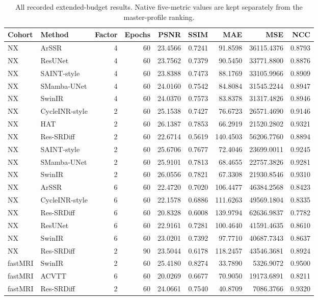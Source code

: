 \begin{table}[t]\centering\small
\caption{All recorded extended-budget results. Native five-metric values are kept separately from the master-profile ranking.}
\begin{tabular}{llrrrrrrr}\toprule Cohort&Method&Factor&Epochs&PSNR&SSIM&MAE&MSE&NCC\\\midrule
NX & ArSSR & 4 & 60 & 23.4566 & 0.7241 & 91.8598 & 36115.4376 & 0.8793\\
NX & ResUNet & 4 & 60 & 23.7562 & 0.7379 & 90.5450 & 33771.8800 & 0.8876\\
NX & SAINT-style & 4 & 60 & 23.8388 & 0.7473 & 88.1769 & 33105.9966 & 0.8909\\
NX & SMamba-UNet & 4 & 60 & 24.0160 & 0.7542 & 84.8084 & 31545.2244 & 0.8947\\
NX & SwinIR & 4 & 60 & 24.0370 & 0.7573 & 83.8378 & 31317.4826 & 0.8946\\
NX & CycleINR-style & 2 & 60 & 25.1538 & 0.7427 & 76.6723 & 26571.4690 & 0.9146\\
NX & HAT & 2 & 60 & 26.1387 & 0.7853 & 66.2919 & 21520.2802 & 0.9321\\
NX & Res-SRDiff & 2 & 60 & 22.6714 & 0.5619 & 140.4503 & 56206.7760 & 0.8894\\
NX & SAINT-style & 2 & 60 & 25.6706 & 0.7677 & 72.4046 & 23699.0011 & 0.9245\\
NX & SMamba-UNet & 2 & 60 & 25.9101 & 0.7813 & 68.4655 & 22757.3826 & 0.9281\\
NX & SwinIR & 2 & 60 & 26.0556 & 0.7821 & 67.3308 & 21930.8546 & 0.9310\\
NX & ArSSR & 6 & 60 & 22.4720 & 0.7020 & 106.4477 & 46384.2568 & 0.8423\\
NX & CycleINR-style & 6 & 60 & 22.1578 & 0.6886 & 111.6263 & 49569.1804 & 0.8335\\
NX & Res-SRDiff & 6 & 60 & 20.8328 & 0.6008 & 139.9794 & 62636.9837 & 0.7782\\
NX & ResUNet & 6 & 60 & 22.9161 & 0.7281 & 100.4640 & 41591.4635 & 0.8610\\
NX & SwinIR & 6 & 60 & 23.0201 & 0.7392 & 97.7710 & 40687.7343 & 0.8637\\
NX & Res-SRDiff & 2 & 90 & 23.5044 & 0.6178 & 118.2457 & 43546.3681 & 0.8924\\
fastMRI & SwinIR & 2 & 60 & 25.4180 & 0.8274 & 33.7890 & 5326.9072 & 0.9500\\
fastMRI & ACVTT & 6 & 60 & 20.0269 & 0.6677 & 70.9050 & 19173.6891 & 0.8211\\
fastMRI & Res-SRDiff & 2 & 60 & 24.0661 & 0.7540 & 40.8709 & 7086.3766 & 0.9320\\
\bottomrule\end{tabular}\end{table}
